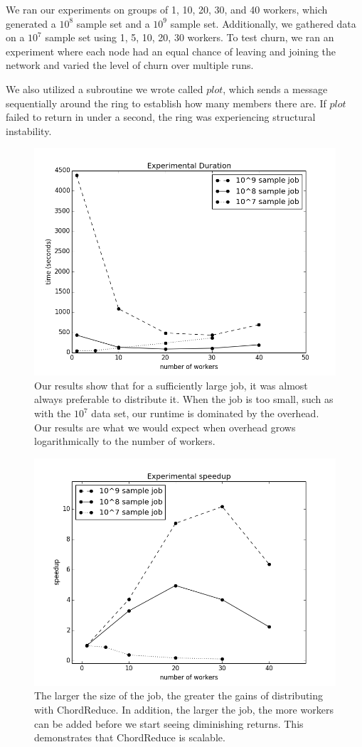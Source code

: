 We ran our experiments on groups of 1, 10, 20, 30, and 40 workers, which generated a $10^{8}$ sample set and a $10^{9}$ sample set.
Additionally, we gathered data on a $10^{7}$ sample set using 1, 5, 10, 20, 30 workers.  
To test churn, we ran an experiment where each node had an equal chance of leaving and joining the network and varied the level of churn over multiple runs.  

We also utilized a subroutine we wrote called $plot$, which sends a message sequentially around the ring to establish how many members there are.  
If $plot$ failed to return in under a second, the ring was experiencing structural instability.

\begin{figure}
	\centering
	\includegraphics[width=0.5\linewidth]{figs/expTime}
	\caption{Our results show that for a sufficiently large job, it was almost always preferable to distribute it.  
		When the job is too small, such as with the $10^{7}$ data set, our runtime is dominated by the overhead.  
		Our results are what we would expect when overhead grows logarithmically to the number of workers.}
	\label{fig:expTime}
\end{figure}


\begin{figure}
	\centering
	\includegraphics[width=0.5\linewidth]{figs/expSpeed}
	\caption{The larger the size of the job, the greater the gains of distributing with ChordReduce.  In addition, the larger the job, the more workers can be added before we start seeing diminishing returns.  This demonstrates that ChordReduce is scalable.}
	\label{fig:expSpeed}
\end{figure}

